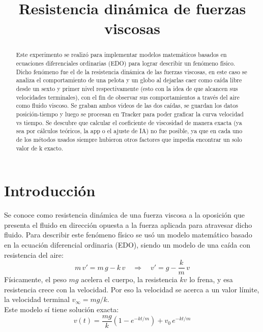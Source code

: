 \documentclass[12pt, journal]{IEEEtran}
\begin{document}
	\title{ Resistencia dinámica de fuerzas viscosas  \\}

	\author{
		}

	\maketitle

	\begin{abstract}
		Este experimento se realizó para implementar modelos matemáticos basados en ecuaciones diferenciales ordinarias (EDO) para lograr describir un fenómeno físico.
		Dicho fenómeno fue el de la resistencia dinámica de las fuerzas viscosas, en este caso se analiza el comportamiento de una pelota y un globo al dejarlas caer como caída libre desde un sexto y primer nivel respectivamente (esto con la idea de que alcancen sus velocidades terminales),
		con el fin de observar sus comportamientos a través del aire como fluido viscoso. Se graban ambos videos de las dos caídas, se guardan los datos posición-tiempo y luego se procesan en Tracker para poder graficar la curva velocidad vs tiempo.
		Se descubre que calcular el coeficiente de viscosidad de manera exacta (ya sea por cálculos teóricos, la app o el ajuste de IA) no fue posible, ya que en cada uno de los métodos usados siempre hubieron otros factores que impedía encontrar un solo valor de k exacto.
	\end{abstract}

	\section{Introducción}
		Se conoce como resistencia dinámica de una fuerza viscosa a la oposición que presenta el fluido en dirección opuesta a la fuerza aplicada para atravesar dicho fluido.
		Para describir este fenómeno físico se usó un modelo matemático basado en la ecuación diferencial ordinaria (EDO), siendo un modelo de una caída con resistencia del aire:
		$$m\,v' = m\,g - k\,v \quad\Longrightarrow\quad v' = g - \frac{k}{m}\,v$$
		Físicamente, el peso $mg$ acelera el cuerpo, la resistencia $kv$ lo frena, y esa resistencia crece con la velocidad. Por eso la velocidad se acerca a un valor límite, la velocidad terminal $v_{\infty} = mg/k$.
		\\ Este modelo sí tiene solución exacta:
		$$v(t) = \frac{mg}{k}\left(1 - e^{-kt/m}\right) + v_0\,e^{-kt/m}$$
\end{document}
